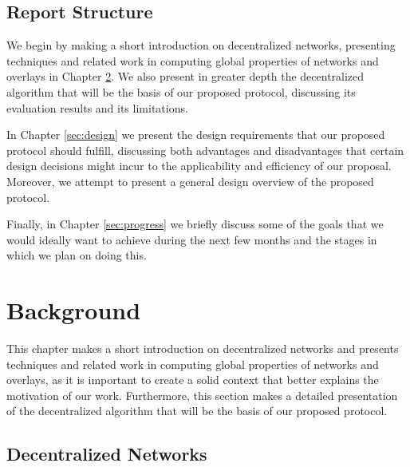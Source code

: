 \documentclass[MSc]{icldt}
\begin{document}
\section{Report Structure}

We begin by making a short introduction on decentralized networks, presenting techniques and related work in computing global properties of networks and overlays in Chapter \ref{sec:background}. We also present in greater depth the decentralized algorithm that will be the basis of our proposed protocol, discussing its evaluation results and its limitations.

In Chapter \ref{sec:design} we present the design requirements that our proposed protocol should fulfill, discussing both advantages and disadvantages that certain design decisions might incur to the applicability and efficiency of our proposal. Moreover, we attempt to present a general design overview of the proposed protocol.

Finally, in Chapter \ref{sec:progress} we briefly discuss some of the goals that we would ideally want to achieve during the next few months and the stages in which we plan on doing this.



\chapter{Background}
\label{sec:background}

This chapter makes a short introduction on decentralized networks and presents techniques and related work in computing global properties of networks and overlays, as it is important to create a solid context that better explains the motivation of our work. Furthermore, this section makes a detailed presentation of the decentralized algorithm that will be the basis of our proposed protocol.



\section{Decentralized Networks}
\end{document}
